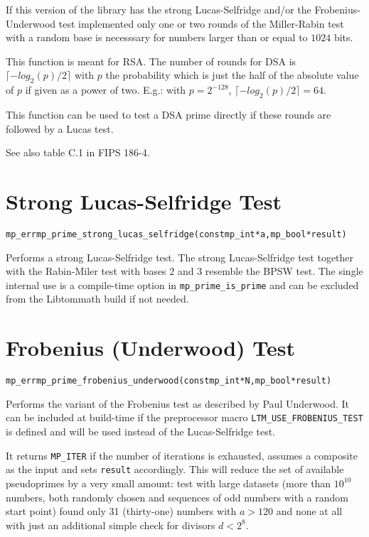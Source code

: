 \documentclass[synpaper]{book}
\begin{document}
If this version of the library has the strong Lucas-Selfridge and/or the Frobenius-Underwood test implemented only one or two rounds of the Miller-Rabin test with a random base is necesssary for numbers larger than or equal to $1024$ bits.

This function is meant for RSA. The number of rounds for DSA is $\lceil -log_2(p)/2\rceil$ with $p$ the probability which is just the half of the absolute value of $p$ if given as a power of two. E.g.: with $p = 2^{-128}$, $\lceil -log_2(p)/2\rceil = 64$.

This function can be used to test a DSA prime directly if these rounds are followed by a Lucas test.

See also table C.1 in FIPS 186-4.

\section{Strong Lucas-Selfridge Test}
\begin{alltt}
mp_err mp_prime_strong_lucas_selfridge(const mp_int *a, mp_bool *result)
\end{alltt}
Performs a strong Lucas-Selfridge test. The strong Lucas-Selfridge test together with the Rabin-Miler test with bases $2$ and $3$ resemble the BPSW test. The single internal use is a compile-time option in \texttt{mp\_prime\_is\_prime} and can be excluded
from the Libtommath build if not needed.

\section{Frobenius (Underwood)  Test}
\begin{alltt}
mp_err mp_prime_frobenius_underwood(const mp_int *N, mp_bool *result)
\end{alltt}
Performs the variant of the Frobenius test as described by Paul Underwood. It can be included at build-time if the preprocessor macro \texttt{LTM\_USE\_FROBENIUS\_TEST} is defined and will be used instead of the Lucas-Selfridge test.

It returns \texttt{MP\_ITER} if the number of iterations is exhausted, assumes a composite as the input and sets \texttt{result} accordingly. This will reduce the set of available pseudoprimes by a very small amount: test with large datasets (more than $10^{10}$ numbers, both randomly chosen and sequences of odd numbers with a random start point) found only 31 (thirty-one) numbers with $a > 120$ and none at all with just an additional simple check for divisors $d < 2^8$.
\end{document}
